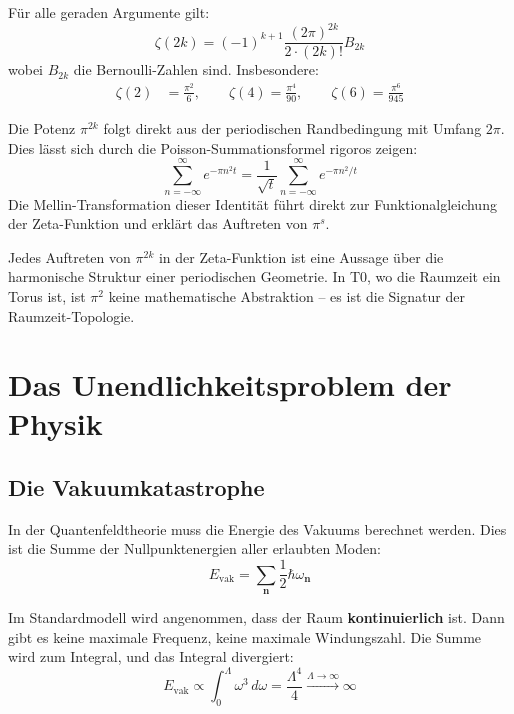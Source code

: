 	\begin{keypoint}
		Für alle geraden Argumente gilt:
		\begin{equation}
			\zeta(2k) = (-1)^{k+1} \frac{(2\pi)^{2k}}{2 \cdot (2k)!} B_{2k}
			\label{eq:euler-general}
		\end{equation}
		wobei $B_{2k}$ die Bernoulli-Zahlen sind. Insbesondere:
		\begin{align}
			\zeta(2) &= \frac{\pi^2}{6}, \qquad
			\zeta(4) = \frac{\pi^4}{90}, \qquad
			\zeta(6) = \frac{\pi^6}{945}
		\end{align}
	\end{keypoint}
	
	Die Potenz $\pi^{2k}$ folgt direkt aus der periodischen Randbedingung mit Umfang $2\pi$. Dies lässt sich durch die Poisson-Summationsformel rigoros zeigen:
	\begin{equation}
		\sum_{n=-\infty}^{\infty} e^{-\pi n^2 t} = \frac{1}{\sqrt{t}} \sum_{n=-\infty}^{\infty} e^{-\pi n^2 / t}
	\end{equation}
	Die Mellin-Transformation dieser Identität führt direkt zur Funktionalgleichung der Zeta-Funktion und erklärt das Auftreten von $\pi^s$.
	
	\begin{keypoint}
		Jedes Auftreten von $\pi^{2k}$ in der Zeta-Funktion ist eine Aussage über die harmonische Struktur einer periodischen Geometrie. In T0, wo die Raumzeit ein Torus ist, ist $\pi^2$ keine mathematische Abstraktion -- es ist die Signatur der Raumzeit-Topologie.
	\end{keypoint}
	
	
	\section{Das Unendlichkeitsproblem der Physik}
	
	\subsection{Die Vakuumkatastrophe}
	
	In der Quantenfeldtheorie muss die Energie des Vakuums berechnet werden. Dies ist die Summe der Nullpunktenergien aller erlaubten Moden:
	\begin{equation}
		E_{\text{vak}} = \sum_{\mathbf{n}} \frac{1}{2} \hbar \omega_{\mathbf{n}}
	\end{equation}
	
	Im Standardmodell wird angenommen, dass der Raum \textbf{kontinuierlich} ist. Dann gibt es keine maximale Frequenz, keine maximale Windungszahl. Die Summe wird zum Integral, und das Integral divergiert:
	\begin{equation}
		E_{\text{vak}} \propto \int_0^{\Lambda} \omega^3 \, d\omega = \frac{\Lambda^4}{4} \xrightarrow{\Lambda \to \infty} \infty
	\end{equation}
	
